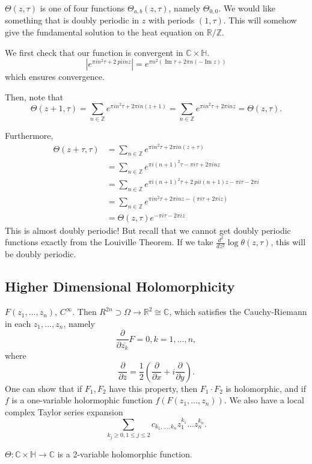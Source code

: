 \documentclass[12pt]{scrartcl}
\newcommand{\Z}{\mathbb{Z}}
\newcommand{\R}{\mathbb{R}}
\newcommand{\C}{\mathbb C}
\let \ol \overline
\begin{document}
$\Theta(z, \tau)$ is one of four functions $\Theta_{a, b}(z, \tau)$, namely $\Theta_{0, 0}$.  We would like something that is doubly periodic in $z$ with periods $(1, \tau)$. This will somehow give the fundamental solution to the heat equation on $\R/\Z$. 

We first check that our function is convergent in $\C \times \mathbb H$.
$$|e^{\pi i n^2 \tau + 2\ pi i n z}| = e^{\pi n^2(\operatorname{Im}{\tau} + 2\pi n (-\operatorname{Im}{z})) }$$
which ensures convergence.  

Then, note that 
$$\Theta(z+1, \tau) = \sum_{n \in \Z} e^{\pi i n^2 \tau + 2 \pi i n(z+1)} = \sum_{n \in \Z} e^{\pi i n^2 \tau + 2\pi i n z} = \Theta(z, \tau).$$

Furthermore,
\begin{align*}
\Theta(z+\tau, \tau) &= \sum_{n \in \Z} e^{\pi i n^2 \tau + 2\pi i n (z + \tau)} \\
&= \sum_{n \in \Z} e^{\pi i (n + 1)^2 \tau - \pi i \tau + 2\pi i n z} \\
&= \sum_{n \in \Z} e^{\pi i (n + 1)^2 \tau + 2\ pi i (n + 1)z - \pi i \tau - 2 \pi i } \\
&= \sum_{n \in \Z} e^{\pi i n^2 \tau + 2\pi i n z - (\pi i \tau + 2\pi i z)}\\
&= \Theta(z, \tau) e^{-\pi i \tau - 2 \pi i z} 
\end{align*}
This is almost doubly periodic!  But recall that we cannot get doubly periodic functions exactly from the Louiville Theorem.  If we take $\frac{d^2}{dz^2} \log \theta(z, \tau)$, this will be doubly periodic.

\subsection{Higher Dimensional Holomorphicity}
$F(z_1, \dots, z_n)$, $C^\infty$.  Then $R^{2n} \supset \Omega \to \R^2 \cong \C$, which satisfies the Cauchy-Riemann in each $z_1, \dots, z_n$, namely
$$\frac{\partial}{\partial \ol{z_k}}F = 0, k =1, \dots, n,$$
where 
$$\frac{\partial}{\partial \ol{z}} = \frac{1}{2} (\frac{\partial}{\partial x} + i \frac{\partial}{\partial y}).$$
One can show that if $F_1, F_2$ have this property, then $F_1 \cdot F_2$ is holomorphic, and if $f$ is a one-variable holormophic function $f(F(z_1, \dots, z_n))$.  We also have a local complex Taylor series expansion
$$\sum_{k_j \ge 0, 1 \le j \le 2} c_{k_1, \dots, k_n} z_1^{k_1} \dots z_n^{k_n}.$$

$\Theta: \C \times \mathbb H \to \C$ is a 2-variable holomorphic function.  
\pagebreak
\end{document}
